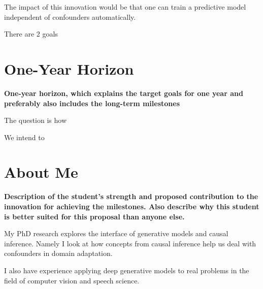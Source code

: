 \documentclass[
  journal=medium,
  manuscript=Qualcomm-Innovation-Fellowship-Proposal,
  year=22-February-2023,
]{cup-journal}
\begin{document}
The impact of this innovation would be that one can train a predictive model independent of confounders automatically.

There are 2 goals 

\section{One-Year Horizon}

\textbf{One-year horizon, which explains the target goals for one year and preferably also includes the long-term milestones}

The question is how 

We intend to 

\section{About Me}

\textbf{Description of the student's strength and proposed contribution to the innovation for achieving the milestones. Also describe why this student is better suited for this proposal than anyone else.}


My PhD research explores the interface of generative models and causal inference. Namely I look at how concepts from causal inference help us deal with confounders in domain adaptation.

I also have experience applying deep generative models to real problems in the field of computer vision and speech science.

\printbibliography
\end{document}
